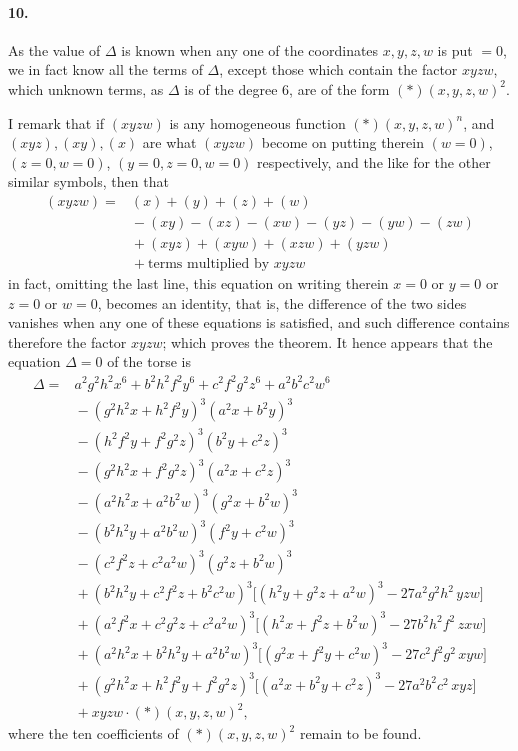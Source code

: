 \documentclass[11pt,a4paper]{article}
\begin{document}
\paragraph{10.}
As the value of $\Delta$ is known when any one of the coordinates $x, y, z, w$ is put
$= 0$, we in fact know all the terms of $\Delta$, except those which contain the factor
$xyzw$, which unknown terms, as $\Delta$ is of the degree $6$, are of the form
$(*)(x, y, z, w)^2$.

I remark that if $(xyzw)$ is any homogeneous function $(*)(x, y, z, w)^n$, and
$(xyz), (xy), (x)$ are what $(xyzw)$ become on putting therein $(w = 0)$, $(z = 0, w = 0)$,
$(y = 0, z = 0, w = 0)$ respectively, and the like for the other similar symbols, then that
\[
\begin{aligned}
(xyzw) = {}& (x) + (y) + (z) + (w) \\
& {} - (xy) - (xz) - (xw) - (yz) - (yw) - (zw) \\
& {} + (xyz) + (xyw) + (xzw) + (yzw) \\
& {} + \text{terms multiplied by } xyzw
\end{aligned}
\]
in fact, omitting the last line, this equation on writing therein $x = 0$ or $y = 0$ or
$z = 0$ or $w = 0$, becomes an identity, that is, the difference of the two sides vanishes
when any one of these equations is satisfied, and such difference contains therefore the
factor $xyzw$; which proves the theorem. It hence appears that the equation $\Delta = 0$
of the torse is
\[
\begin{aligned}
\Delta = {}& a^2 g^2 h^2 x^6 + b^2 h^2 f^2 y^6 + c^2 f^2 g^2 z^6 + a^2 b^2 c^2 w^6 \\
& {} - (g^2 h^2 x + h^2 f^2 y)^3 (a^2 x + b^2 y)^3 \\
& {} - (h^2 f^2 y + f^2 g^2 z)^3 (b^2 y + c^2 z)^3 \\
& {} - (g^2 h^2 x + f^2 g^2 z)^3 (a^2 x + c^2 z)^3 \\
& {} - (a^2 h^2 x + a^2 b^2 w)^3 (g^2 x + b^2 w)^3 \\
& {} - (b^2 h^2 y + a^2 b^2 w)^3 (f^2 y + c^2 w)^3 \\
& {} - (c^2 f^2 z + c^2 a^2 w)^3 (g^2 z + b^2 w)^3 \\
& {} + (b^2 h^2 y + c^2 f^2 z + b^2 c^2 w)^3 \bigl[(h^2 y + g^2 z + a^2 w)^3 - 27 a^2 g^2 h^2 \, yzw \bigr] \\
& {} + (a^2 f^2 x + c^2 g^2 z + c^2 a^2 w)^3 \bigl[(h^2 x + f^2 z + b^2 w)^3 - 27 b^2 h^2 f^2 \, zxw \bigr] \\
& {} + (a^2 h^2 x + b^2 h^2 y + a^2 b^2 w)^3 \bigl[(g^2 x + f^2 y + c^2 w)^3 - 27 c^2 f^2 g^2 \, xyw \bigr] \\
& {} + (g^2 h^2 x + h^2 f^2 y + f^2 g^2 z)^3 \bigl[(a^2 x + b^2 y + c^2 z)^3 - 27 a^2 b^2 c^2 \, xyz \bigr] \\
& {} + xyzw \cdot (*)(x, y, z, w)^2,
\end{aligned}
\]
where the ten coefficients of $(*)(x, y, z, w)^2$ remain to be found.
\end{document}
